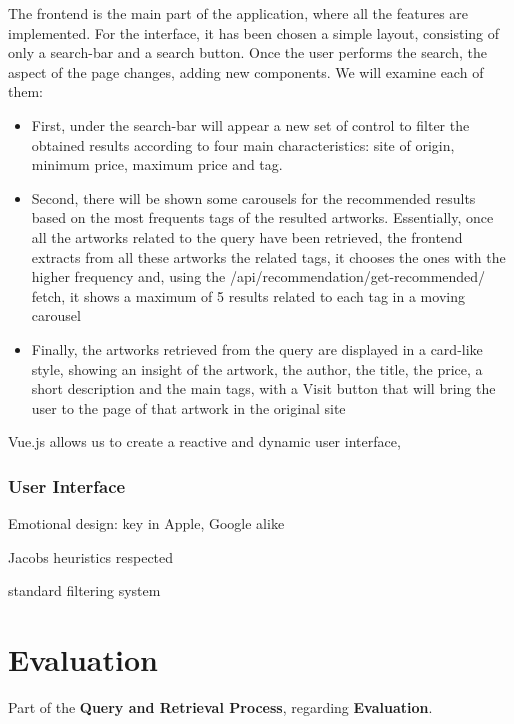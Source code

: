 \documentclass[12pt]{spieman}  %
\begin{document}
\begin{spacing}{1}
    The frontend is the main part of the application, where all the features are implemented.\newline
    For the interface, it has been chosen a simple layout, consisting of only a search-bar and a search button. Once the user performs the search, the aspect of the page changes, adding new components. We will examine each of them:
    \begin{itemize}
        \item First, under the search-bar will appear a new set of control to filter the obtained results according to four main characteristics: site of origin, minimum price, maximum price and tag.
        \item Second, there will be shown some carousels for the recommended results based on the most frequents tags of the resulted artworks. Essentially, once all the artworks related to the query have been retrieved, the frontend extracts from all these artworks the related tags, it chooses the ones with the higher frequency and, using the /api/recommendation/get-recommended/ fetch, it shows a maximum of 5 results related to each tag in a moving carousel
        \item Finally, the artworks retrieved from the query are displayed in a card-like style, showing an insight of the artwork, the author, the title, the price, a short description and the main tags, with a Visit button that will bring the user to the page of that artwork in the original site
    \end{itemize}

    Vue.js allows us to create a reactive and dynamic user interface,

    \subsubsection{User Interface}\label{sec:ui}

    Emotional design: key in Apple, Google alike

    Jacobs heuristics respected

    standard filtering system


    \section{Evaluation}\label{sec:evaluation}
    Part of the \textbf{Query and Retrieval Process}, regarding \textbf{Evaluation}.\\


\end{spacing}
\end{document}
